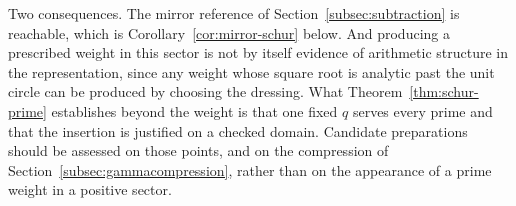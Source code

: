 Two consequences. The mirror reference of
Section~\ref{subsec:subtraction} is reachable, which is
Corollary~\ref{cor:mirror-schur} below. And producing a prescribed weight in
this sector is not by itself evidence of arithmetic structure in the
representation, since any weight whose square root is analytic past the unit
circle can be produced by choosing the dressing. What
Theorem~\ref{thm:schur-prime} establishes beyond the weight is that one fixed
$q$ serves every prime and that the insertion is justified on a checked domain.
Candidate preparations should be assessed on those points, and on the
compression of Section~\ref{subsec:gammacompression}, rather than on the
appearance of a prime weight in a positive sector.

